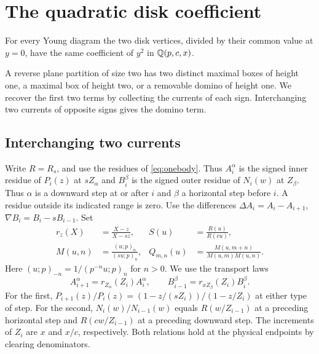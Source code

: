 \section{The quadratic disk coefficient}\label{sec:quadratic}

\begin{theorem}\label{thm:quadraticdisk}
For every Young diagram the two disk vertices, divided by their common
value at $y=0$, have the same coefficient of $y^2$ in $\mathbb Q(p,c,x)$.
\end{theorem}

A reverse plane partition of size two has two distinct maximal boxes of
height one, a maximal box of height two, or a removable domino of height one.
We recover the first two terms by collecting the currents of each sign.
Interchanging two currents of opposite signs gives the domino term.

\subsection{Interchanging two currents}
Write $R=R_s$, and use the residues of \eqref{eq:onebody}. Thus $A_i^\alpha$ is the signed inner residue of $P_i(z)$ at
$sZ_\alpha$ and $B_i^\beta$ is the signed outer residue of $N_i(w)$ at
$Z_\beta$. Thus $\alpha$ is a downward step at or after $i$ and $\beta$
a horizontal step before $i$. A residue outside its indicated range is
zero. Use the differences $\Delta A_i=A_i-A_{i+1}$,
$\nabla B_i=B_i-sB_{i-1}$. Set
\[
\begin{aligned}
 r_z(X)&=\frac{X-z}{X-sz},& S(u)&=\frac{R(u)}{R(cu)},\\
 M(u,n)&=\frac{(u;p)_n}{(su;p)_n},&
 Q_{m,n}(u)&=\frac{M(u,m+n)}{M(u,m)M(u,n)} .
\end{aligned}
\]
Here $(u;p)_{-n}=1/(p^{-n}u;p)_n$ for $n>0$. We use the transport laws
\begin{equation}\label{eq:qtrans}
 A_{i+1}^\alpha=r_{Z_\alpha}(Z_i)A_i^\alpha,\qquad
 B_{i-1}^\beta=r_{xZ_\beta}(Z_i)B_i^\beta .
\end{equation}
For the first, $P_{i+1}(z)/P_i(z)=(1-z/(sZ_i))/(1-z/Z_i)$ at either
type of step. For the second, $N_i(w)/N_{i-1}(w)$ equals
$R(w/Z_{i-1})$ at a preceding horizontal step and $R(cw/Z_{i-1})$
at a preceding downward step. The increments of $Z_i$ are $x$ and $x/c$,
respectively. Both relations hold at the physical endpoints by clearing
denominators.

